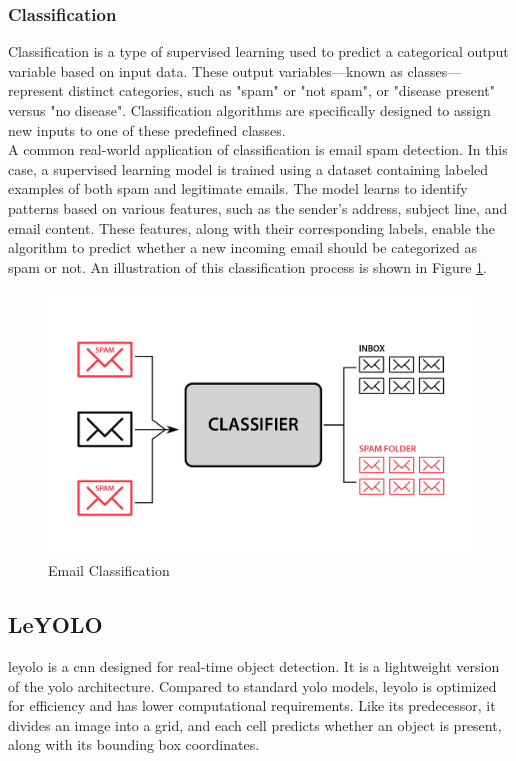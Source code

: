 \subsubsection*{Classification}
\label{subsubsec:classification}

Classification is a type of supervised learning used to predict a categorical output variable based on input data. These output variables—known as classes—represent distinct categories, such as "spam" or "not spam", or "disease present" versus "no disease". Classification algorithms are specifically designed to assign new inputs to one of these predefined classes. \cite{google:supervised-learning} \\

A common real-world application of classification is email spam detection. In this case, a supervised learning model is trained using a dataset containing labeled examples of both spam and legitimate emails. The model learns to identify patterns based on various features, such as the sender's address, subject line, and email content. These features, along with their corresponding labels, enable the algorithm to predict whether a new incoming email should be categorized as spam or not. An illustration of this classification process is shown in Figure \ref{fig:classification}. \cite{google:supervised-learning}

\begin{figure}[h!]
    \centering
    \includegraphics[width=0.75\linewidth]{figures/theory/classification.jpg}
    \caption[Email Classification]{Email Classification \cite{analytixlabs:classification}}
    \label{fig:classification}
\end{figure}

\subsection{LeYOLO}
\gls{leyolo} is a \gls{cnn} designed for real-time object detection. It is a lightweight version of the \gls{yolo} architecture. Compared to standard \gls{yolo} models, \gls{leyolo} is optimized for efficiency and has lower computational requirements. Like its predecessor, it divides an image into a grid, and each cell predicts whether an object is present, along with its bounding box coordinates. \\


